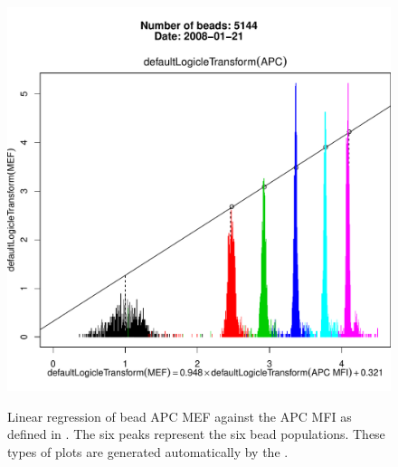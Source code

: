 \begin{figure}
\centering
\begin{minipage}{.65\textwidth}
\includegraphics[width=\linewidth]{figures/flowBeads}
\end{minipage}
{ Linear regression of bead APC MEF against the APC MFI as defined in .}
{
The six peaks represent the six bead populations.
These types of plots are generated automatically by the .
}
\begin{minipage}{.65\textwidth}

\end{minipage}
\end{figure}
